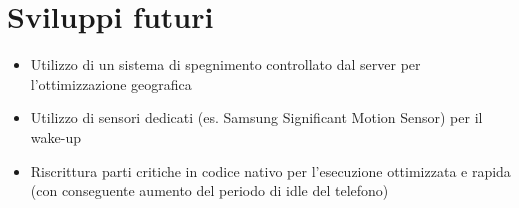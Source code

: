 \documentclass[a4paper,10pt]{memoir}
\begin{document}
\chapter{Sviluppi futuri}

\begin{itemize}
\item Utilizzo di un sistema di spegnimento controllato dal server per l'ottimizzazione geografica
\item Utilizzo di sensori dedicati (es. Samsung Significant Motion Sensor) per il wake-up
\item Riscrittura parti critiche in codice nativo per l'esecuzione ottimizzata e rapida (con conseguente aumento del periodo di idle del telefono)
\end{itemize}
\end{document}
